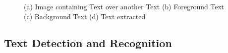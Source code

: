 \begin{figure}[t]
\centering
{}
\caption
{(a) Image containing Text over another Text (b) Foreground Text (c) Background Text (d)
Text extracted}
\end{figure}


\subsection{Text Detection and Recognition}

